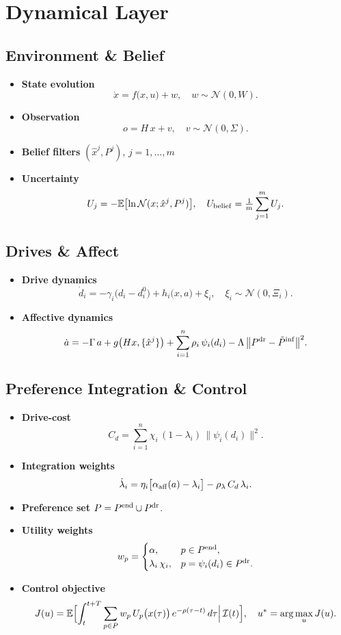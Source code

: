 \documentclass{article}
\begin{document}
\section{Dynamical Layer}
\subsection{Environment \& Belief}
\begin{itemize}
  \item \textbf{State evolution}
  \[
    \dot x = f\bigl(x,u\bigr) + w,\quad w\sim\mathcal N(0,W).
  \]
  \item \textbf{Observation}
  \[
    o = H\,x + v,\quad v\sim\mathcal N(0,\Sigma).
  \]
  \item \textbf{Belief filters} $(\hat x^j,P^j)$, $j=1,\dots,m$
  \item \textbf{Uncertainty}
  \[
    U_j = -\mathbb E\bigl[\ln\mathcal N(x;\hat x^j,P^j)\bigr],\quad U_{\rm belief}=\tfrac1m\sum_{j=1}^m U_j.
  \]
\end{itemize}

\subsection{Drives \& Affect}
\begin{itemize}
  \item \textbf{Drive dynamics}
  \[
    \dot d_i = -\gamma_i\bigl(d_i - d^0_i\bigr) + h_i\bigl(x,a\bigr) + \xi_i,\quad \xi_i\sim\mathcal N(0,\Xi_i).
  \]
  \item \textbf{Affective dynamics}
  \[
    \dot a = -\Gamma\,a + g\bigl(Hx,\{\hat x^j\}\bigr) + \sum_{i=1}^n \rho_i\,\psi_i(d_i) - \Lambda\,\bigl\|P^{\rm dr} - \tilde P^{\rm inf}\bigr\|^2.
  \]
\end{itemize}

\subsection{Preference Integration \& Control}
\begin{itemize}
  \item \textbf{Drive-cost}
  \[
    C_d = \sum_{i=1}^n \chi_i\,(1-\lambda_i)\,\|\psi_i(d_i)\|^2.
  \]
  \item \textbf{Integration weights}
  \[
    \dot\lambda_i = \eta_i\bigl[\alpha_{\rm aff}(a)-\lambda_i\bigr] - \rho_\lambda\,C_d\,\lambda_i.
  \]
  \item \textbf{Preference set} $P = P^{\rm end}\cup P^{\rm dr}$.
  \item \textbf{Utility weights}
  \[
    w_p =
    \begin{cases}
      \alpha, & p\in P^{\rm end},\\
      \lambda_i\,\chi_i, & p=\psi_i(d_i)\in P^{\rm dr}.
    \end{cases}
  \]
  \item \textbf{Control objective}
  \[
    J(u) = \mathbb E\Bigl[\int_t^{t+T}\sum_{p\in P} w_p\,U_p\bigl(x(\tau)\bigr)\,e^{-\rho(\tau-t)}\,d\tau\Big|\,\mathcal I(t)\Bigr],\quad u^*=\arg\max_u J(u).
  \]
\end{itemize}
\end{document}
